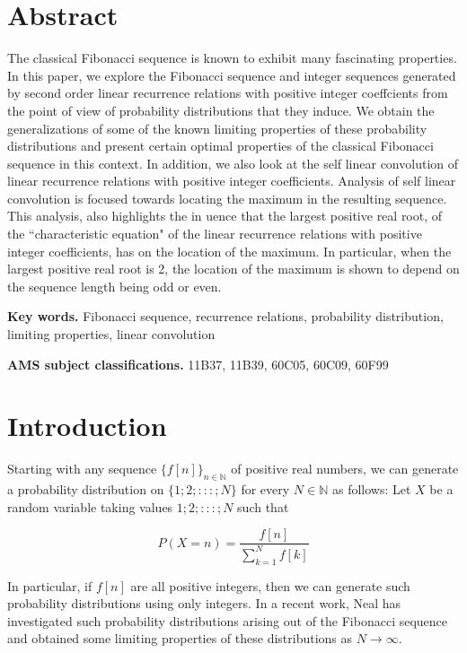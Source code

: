 \begin{multicols}{2}

\section*{Abstract}

The classical Fibonacci sequence is known to exhibit many fascinating properties. In this paper, we explore the Fibonacci sequence and integer sequences generated by second order linear recurrence relations with positive integer coeffcients from the point of view of probability distributions that they induce. We obtain the generalizations of some of the known limiting properties of these probability distributions and present certain optimal properties of the classical Fibonacci sequence in this context. In addition, we also look at the self linear convolution of linear recurrence relations with positive integer coefficients. Analysis of self linear convolution is focused towards locating the maximum in the resulting sequence. This analysis, also highlights the in uence that the largest positive real root, of the ``characteristic equation" of the linear recurrence relations with positive integer coefficients, has on the location of the maximum. In particular, when the largest positive real root is 2, the location of the maximum is shown to depend on the sequence length being odd or even.

\textbf{Key words.} Fibonacci sequence, recurrence relations, probability distribution, limiting properties, linear convolution

\textbf{AMS subject classifications.} 11B37, 11B39, 60C05, 60C09, 60F99

\section{Introduction}\label{section-1}

Starting with any sequence $\{f[n]\}_{n\in \mathbb N}$ of positive real numbers, we can generate a probability distribution on $\{1; 2; : : : ;N\}$ for every $N \in \mathbb N$ as follows: Let $X$ be a random variable taking values $1; 2; : : : ;N$ such that

$$
P(X=n) = \displaystyle{\frac{f[n]}{\displaystyle{\sum_{k=1}^N}f[k]}}
$$

In particular, if $f[n]$ are all positive integers, then we can generate such probability distributions using only integers. In a recent work, Neal \cite{art2-key01} has investigated such probability distributions arising out of the Fibonacci sequence and obtained some limiting properties of these distributions as $N \rightarrow \infty$.


\end{multicols}
